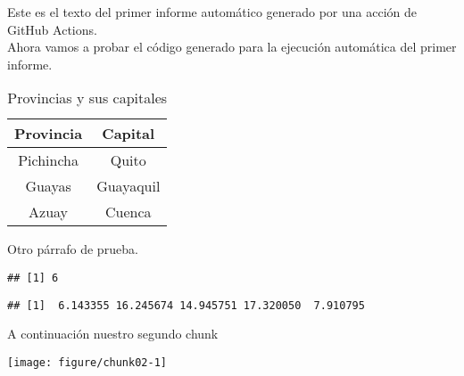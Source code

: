 Este es el texto del primer informe automático generado por una acción de GitHub Actions.\\

Ahora vamos a probar el código generado para la ejecución automática del primer informe.

\begin{table}[H]
\centering
\begin{tabular}{|c|c|}\hline
\textbf{Provincia} & \textbf{Capital} \\ \hline
Pichincha & Quito \\ \hline
Guayas & Guayaquil \\ \hline
Azuay & Cuenca \\ \hline
\end{tabular}
\caption{Provincias y sus capitales}
\end{table}

Otro párrafo de prueba.
\begin{knitrout}
\color{fgcolor}\begin{kframe}
\begin{alltt}
\hlopt{+}\hlopt{-}
\end{alltt}
\begin{verbatim}
## [1] 6
\end{verbatim}
\begin{alltt}
\hldef{(}\hldef{,} \hldef{=} \hldef{,}  \hldef{=}  \hldef{)}
\end{alltt}
\begin{verbatim}
## [1]  6.143355 16.245674 14.945751 17.320050  7.910795
\end{verbatim}
\end{kframe}
\end{knitrout}


A continuación nuestro segundo chunk
\begin{knitrout}
\color{fgcolor}
\texttt{[image: figure/chunk02-1]} 
\end{knitrout}
